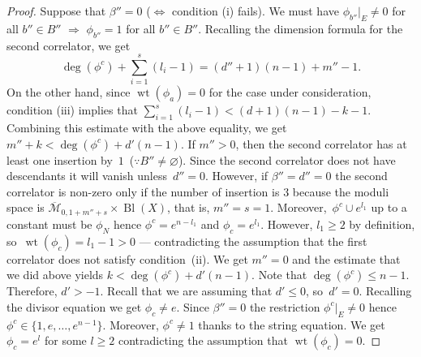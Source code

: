 \documentclass[10pt,a4paper]{article}
\numberwithin{equation}{section}
\begin{document}
\begin{proof}
Suppose that $\beta''=0$ ($\Leftrightarrow$ condition (i) fails). We must have $\phi_{b''}|_E\neq 0$ for all $b''\in B''$ $\Rightarrow$ $\phi_{b''}=1$ for all $b''\in B''$. Recalling the dimension formula for the second correlator, we get
\[
\operatorname{deg}(\phi^c)+\sum_{i=1}^{s} (l_i-1) = (d''+1)(n-1) + m''-1.
\]
On the other hand, since $\operatorname{wt}(\phi_a)=0$ for the case under consideration, condition (iii) implies that $\sum_{i=1}^s (l_i-1) < (d+1)(n-1) -k-1$. Combining this estimate with the above equality, we get~$m''+k < \operatorname{deg}(\phi^c) + d'(n-1).$ If $m''>0$, then the second correlator has at least one insertion by~$1$~($\because B''\neq \varnothing$). Since the second correlator does not have descendants it will vanish unless~$d''=0$. However, if $\beta''=d''=0$ the second correlator is non-zero only if the number of insertion is $3$ because the moduli space is $\overline{\mathcal{M}}_{0,1+m''+s}\times \operatorname{Bl}(X)$, that is, $m''=s=1$. Moreover,~$\phi^c \cup e^{l_1}$ up to a constant must be $\phi_N$ hence $\phi^c = e^{n-l_1}$ and $\phi_c= e^{l_1}$. However, $l_1\geq 2$ by definition, so~$\operatorname{wt}(\phi_c)=l_1-1>0$ --- contradicting the assumption that the first correlator does not satisfy condition~(ii). We get $m''=0$ and the estimate that we did above yields $k<\operatorname{deg}(\phi^c) + d'(n-1).$ Note that $\operatorname{deg}(\phi^c)\leq n-1$. Therefore, $d'>-1$. Recall that we are assuming that $d'\leq 0$, so~$d'=0$. Recalling the divisor equation we get $\phi_c\neq e$. Since $\beta''=0$ the restriction $\phi^c|_E\neq 0$ hence $\phi^c\in \big\{1,e,\dots,e^{n-1}\big\}$. Moreover, $\phi^c\neq 1$ thanks to the string equation. We get $\phi_c=e^l$ for some $l\geq 2$ contradicting the assumption that $\operatorname{wt}(\phi_c)=0$.


\end{proof}
\end{document}

